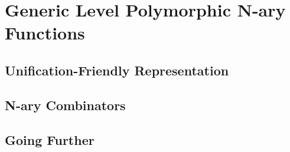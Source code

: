 \documentclass[compress,9pt]{beamer}
\begin{document}
\section{Generic Level Polymorphic N-ary Functions}

\subsection{Unification-Friendly Representation}
\subsection{N-ary Combinators}
\subsection{Going Further}


\begin{frame}
\end{frame}
\end{document}
